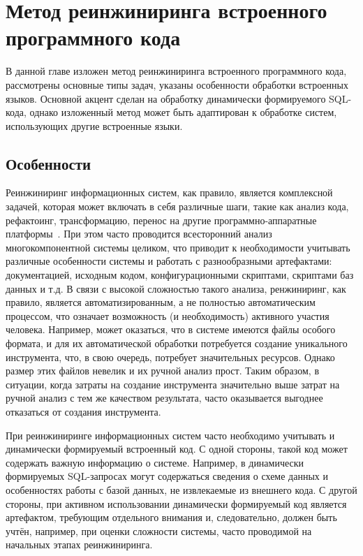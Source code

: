\chapter{Метод реинжиниринга встроенного программного кода}

В данной главе изложен метод реинжиниринга встроенного программного кода, рассмотрены основные типы задач, указаны особенности обработки встроенных языков. Основной акцент сделан на обработку динамически формируемого SQL-кода, однако изложенный метод может быть адаптирован к обработке систем, использующих другие встроенные языки.

\section{Особенности}

Реинжиниринг информационных систем, как правило, является комплексной задачей, которая может включать в себя различные шаги, такие как анализ кода, рефактоинг, трансформацию, перенос на другие программно-аппаратные платформы~\cite{reengANT}. При этом часто проводится всесторонний анализ многокомпонентной системы целиком, что приводит к необходимости учитывать различные особенности системы и работать с разнообразными артефактами: документацией, исходным кодом, конфигурационными скриптами, скриптами баз данных и т.д. В связи с высокой сложностью такого анализа, ренжиниринг, как правило, является автоматизированным, а не полностью автоматическим процессом, что означает возможность (и необходимость) активного участия человека.  Например, может оказаться, что в системе имеются файлы особого формата, и для их автоматической обработки потребуется создание уникального инструмента, что, в свою очередь, потребует значительных ресурсов. Однако размер этих файлов невелик и их ручной анализ прост. Таким образом, в ситуации, когда затраты на создание инструмента значительно выше затрат на ручной анализ с тем же качеством результата, часто оказывается выгоднее отказаться от создания инструмента.

При реинжиниринге информационных систем часто необходимо учитывать и динамически формируемый встроенный код. С одной стороны, такой код может содержать важную информацию о системе. Например, в динамически формируемых SQL-запросах могут содержаться сведения о схеме данных и особенностях работы с базой данных, не извлекаемые из внешнего кода. С другой стороны, при активном использовании динамически формируемый код является артефактом, требующим отдельного внимания и, следовательно, должен быть учтён, например, при оценки сложности системы, часто проводимой на начальных этапах реинжиниринга.

